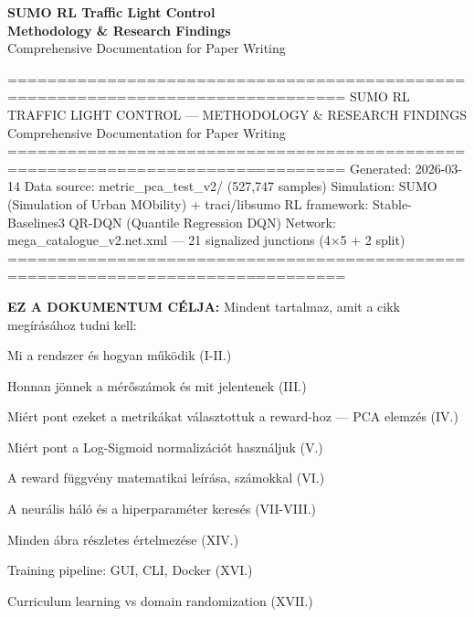\documentclass[11pt,a4paper]{article}
\begin{document}
\begin{center}
    \vspace*{1em}
    {\Huge\bfseries\color{primary} SUMO RL Traffic Light Control}\vspace{0.5em}\\
    {\Large\bfseries Methodology \& Research Findings}\vspace{0.8em}\\
    {\large Comprehensive Documentation for Paper Writing}
    \vspace{1.5em}
\end{center}
\tableofcontents
\newpage

================================================================================
SUMO RL TRAFFIC LIGHT CONTROL — METHODOLOGY \& RESEARCH FINDINGS
Comprehensive Documentation for Paper Writing
================================================================================
Generated: 2026-03-14
Data source: metric\_pca\_test\_v2/ (527,747 samples)
Simulation: SUMO (Simulation of Urban MObility) + traci/libsumo
RL framework: Stable-Baselines3 QR-DQN (Quantile Regression DQN)
Network: mega\_catalogue\_v2.net.xml — 21 signalized junctions (4×5 + 2 split)
================================================================================

\textbf{EZ A DOKUMENTUM CÉLJA:}
Mindent tartalmaz, amit a cikk megírásához tudni kell:
\par\noindent\hspace*{1em}\textbullet{} Mi a rendszer és hogyan működik (I-II.)
\par\noindent\hspace*{1em}\textbullet{} Honnan jönnek a mérőszámok és mit jelentenek (III.)
\par\noindent\hspace*{1em}\textbullet{} Miért pont ezeket a metrikákat választottuk a reward-hoz — PCA elemzés (IV.)
\par\noindent\hspace*{1em}\textbullet{} Miért pont a Log-Sigmoid normalizációt használjuk (V.)
\par\noindent\hspace*{1em}\textbullet{} A reward függvény matematikai leírása, számokkal (VI.)
\par\noindent\hspace*{1em}\textbullet{} A neurális háló és a hiperparaméter keresés (VII-VIII.)
\par\noindent\hspace*{1em}\textbullet{} Minden ábra részletes értelmezése (XIV.)
\par\noindent\hspace*{1em}\textbullet{} Training pipeline: GUI, CLI, Docker (XVI.)
\par\noindent\hspace*{1em}\textbullet{} Curriculum learning vs domain randomization (XVII.)
\end{document}
